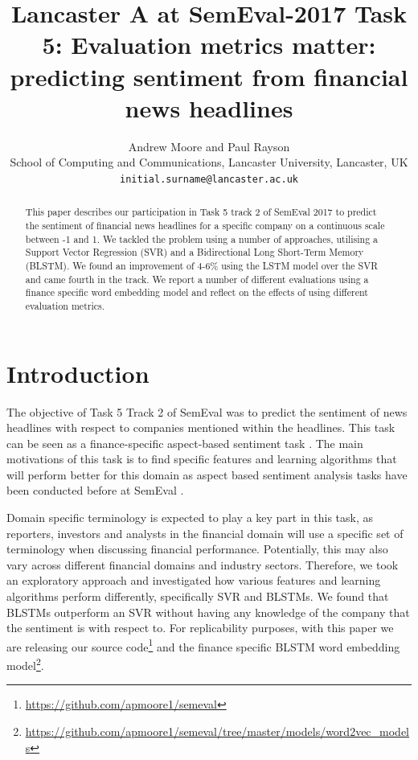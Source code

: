 \documentclass[11pt,a4paper]{article}
\title{Lancaster A at SemEval-2017 Task 5: Evaluation metrics matter: predicting sentiment from financial news headlines}
\author{Andrew Moore and Paul Rayson \\
  School of Computing and Communications, Lancaster University, Lancaster, UK \\
  {\tt initial.surname@lancaster.ac.uk} 
  }
\date{}
\begin{document}
\maketitle
\begin{abstract}
This paper describes our participation in Task 5 track 2 of SemEval 2017 to predict the sentiment of financial news headlines for a specific company on a continuous scale between -1 and 1. We tackled the problem using a number of approaches, utilising a Support Vector Regression (SVR) and a Bidirectional Long Short-Term Memory (BLSTM). We found an improvement of 4-6\% using the LSTM model over the SVR and came fourth in the track. We report a number of different evaluations using a finance specific word embedding model and reflect on the effects of using different evaluation metrics.
\end{abstract}

\section{Introduction}
The objective of Task 5 Track 2 of SemEval  was to predict the sentiment of news headlines with respect to companies mentioned within the headlines. This task can be seen as a finance-specific aspect-based sentiment task \cite{nasukawa2003sentiment}. The main motivations of this task is to find specific features and learning algorithms that will perform better for this domain as aspect based sentiment analysis tasks have been conducted before at SemEval \cite{pontiki2014semeval}. 

Domain specific terminology is expected to play a key part in this task, as reporters, investors and analysts in the financial domain will use a specific set of terminology when discussing financial performance. Potentially, this may also vary across different financial domains and industry sectors.
Therefore, we took an exploratory approach and investigated how various features and learning algorithms perform differently, specifically SVR and BLSTMs. We found that BLSTMs outperform an SVR without having any knowledge of the company that the sentiment is with respect to.
For replicability purposes, with this paper we are releasing our source code\footnote{\url{https://github.com/apmoore1/semeval}} and the finance specific BLSTM word embedding model\footnote{\url{https://github.com/apmoore1/semeval/tree/master/models/word2vec_models}}.
\end{document}
